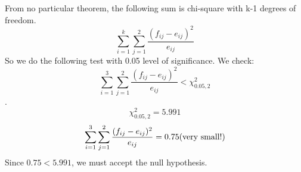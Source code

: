 \documentclass[12pt]{article}
\begin{document}
	\newline
	From no particular theorem, the following sum is chi-square with k-1 degrees of freedom.
	\[\sum_{i=1}^k\sum_{j=1}^2\frac{(f_{ij}-e_{ij})^2}{e_{ij}}\]
	So we do the following test with 0.05 level of significance. We check:
	\[\sum_{i=1}^3\sum_{j=1}^2\frac{(f_{ij}-e_{ij})^2}{e_{ij}} < \chi^2_{0.05, 2}\].
	\[\chi^2_{0.05, 2} = 5.991\]
	\[\sum_{i=1}^3\sum_{j=1}^2\frac{(f_{ij}-e_{ij})^2}{e_{ij}} = 0.75 \textup{(very small!)}\]
	Since \(0.75 < 5.991\), we must accept the null hypothesis.
	\newline \newline
	\newline
	\newline
	\newpage
\end{document}
